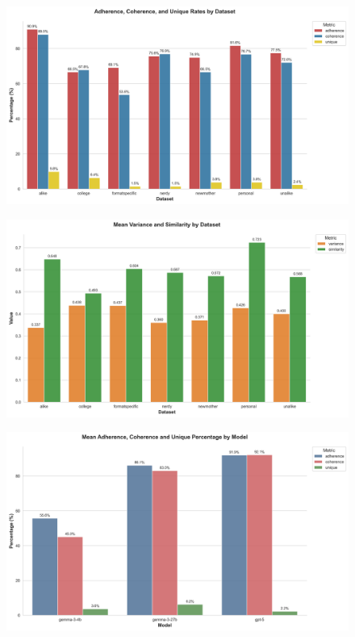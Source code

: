 \documentclass[11pt]{article}
\begin{document}
\begin{figure}[h]
    \centering
    \includegraphics[width=\linewidth]{visuals/dataset-acu-rates.png}
    \caption{}
    \label{fig:clustering-gemma-3-4b}
\end{figure}

\begin{figure}[h]
    \centering
    \includegraphics[width=\linewidth]{visuals/dataset-variance-similarity.png}
    \caption{}
    \label{fig:clustering-gemma-3-4b}
\end{figure}

\begin{figure}[h]
    \centering
    \includegraphics[width=\linewidth]{visuals/model-adherence-coherence-unique.png}
    \caption{}
    \label{fig:clustering-gemma-3-4b}
\end{figure}
\end{document}
